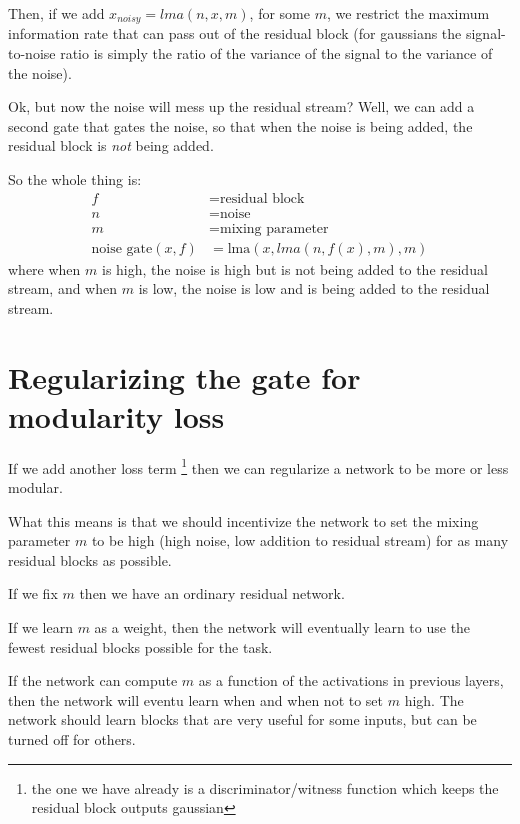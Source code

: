 \documentclass{article}
\begin{document}
Then, if we add $x_{noisy} = lma(n, x, m)$, for some $m$, we restrict the maximum information rate that can pass out of the residual block (for gaussians the signal-to-noise ratio is simply the ratio of the variance of the signal to the variance of the noise).

Ok, but now the noise will mess up the residual stream? Well, we can add a second gate that gates the noise, so that when the noise is being added, the residual block is \textit{not} being added.

So the whole thing is:
\begin{align*}
    f &= \text{residual block} \\
    n &= \text{noise} \\
    m &= \text{mixing parameter} \\
    \text{noise gate}(x, f) &= \text{lma}(x, lma(n, f(x), m), m)
\end{align*}
where when $m$ is high, the noise is high but is not being added to the residual stream, and when $m$ is low, the noise is low and is being added to the residual stream.

\section{Regularizing the gate for modularity loss}

If we add another loss term \footnote{the one we have already is a discriminator/witness function which keeps the residual block outputs gaussian} then we can regularize a network to be more or less modular.

What this means is that we should incentivize the network to set the mixing parameter $m$ to be high (high noise, low addition to residual stream) for as many residual blocks as possible.

If we fix $m$ then we have an ordinary residual network.

If we learn $m$ as a weight, then the network will eventually learn to use the fewest residual blocks possible for the task.

If the network can compute $m$ as a function of the activations in previous layers, then the network will eventu learn when and when not to set $m$ high. The network should learn blocks that are very useful for some inputs, but can be turned off for others.
\end{document}
